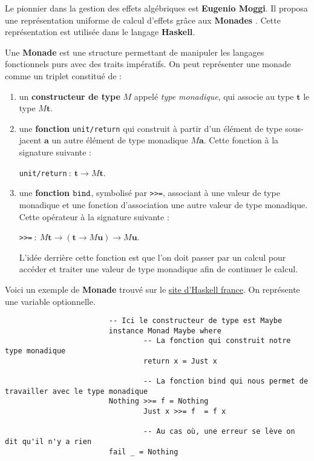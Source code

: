 	Le pionnier dans la gestion des effets algébriques est \textbf{Eugenio Moggi}. Il proposa une représentation uniforme de calcul d'effets grâce aux \textbf{Monades} \cite{DBLP:conf/ac/BentonHM00}. 
	Cette représentation est utilisée dans le langage \textbf{Haskell}.
	
	\begin{definition}
		Une \textbf{Monade} est une structure permettant de manipuler les langages fonctionnels purs
		avec des traits impératifs.
		On peut représenter une monade comme un triplet constitué de : 
		\begin{enumerate}
			\item un \textbf{constructeur de type} $M$ appelé \textit{type monadique}, qui associe au type $\textbf{t}$ le type $M\textbf{t}$.
			\item une \textbf{fonction} \verb|unit/return| qui construit à partir d'un élément de type 
			sous-jacent $\textbf{a}$ un autre élément de type monadique $M\textbf{a}$. Cette fonction à la signature suivante : 
			
			\verb|unit/return|$~:~\textbf{t} \rightarrow M\textbf{t}$.
			\item une \textbf{fonction} $\verb|bind|$, symbolisé par \verb|>>=|, associant à une valeur de type monadique
			et une fonction d'association une autre valeur de type monadique. Cette opérateur à la signature suivante : 
			
			\verb|>>=|$~:~M\textbf{t} \rightarrow (\textbf{t} \rightarrow M\textbf{u}) \rightarrow M\textbf{u}$.
			
			L'idée derrière cette fonction est que l'on doit passer par un calcul pour accéder et traiter une valeur de type monadique afin de continuer le calcul.
		\end{enumerate}
	\end{definition}
	\bigbreak

	\begin{exemple} Voici un exemple de \textbf{Monade} trouvé sur le \href{http://lyah.haskell.fr/pour-une-poignee-de-monades}{site d'Haskell france}. On représente 
		une variable optionnelle.
		\begin{verbatim}
						-- Ici le constructeur de type est Maybe
						instance Monad Maybe where
						        -- La fonction qui construit notre type monadique
						        return x = Just x
						
						        -- La fonction bind qui nous permet de travailler avec le type monadique
				        Nothing >>= f = Nothing
						        Just x >>= f  = f x
								
						        -- Au cas où, une erreur se lève on dit qu'il n'y a rien
				        fail _ = Nothing
		\end{verbatim}
	\end{exemple}
	\bigbreak
	

